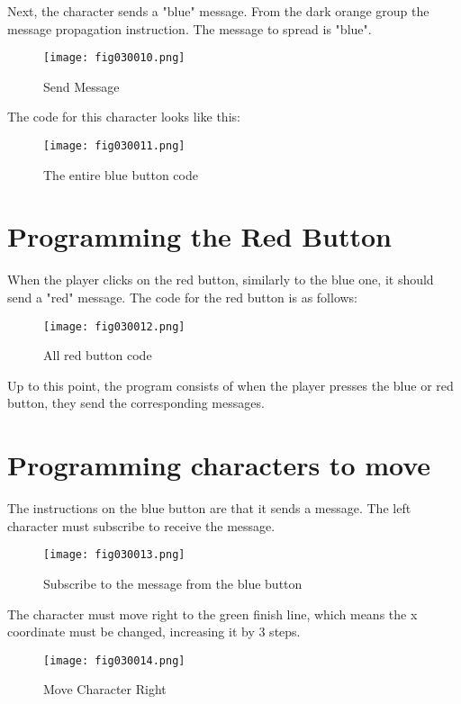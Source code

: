 Next, the character sends a "blue" message. From the dark orange group the message propagation instruction. The message to spread is "blue".

\begin{figure}[H]
   \centering
   \texttt{[image: fig030010.png]}
   \caption{Send Message}
\label{fig030010}
\end{figure}

The code for this character looks like this:

\begin{figure}[H]
   \centering
   \texttt{[image: fig030011.png]}
   \caption{The entire blue button code}
\label{fig030011}
\end{figure}

\section{Programming the Red Button}
When the player clicks on the red button, similarly to the blue one, it should send a "red" message. The code for the red button is as follows:

\begin{figure}[H]
   \centering
   \texttt{[image: fig030012.png]}
   \caption{All red button code}
\label{fig030012}
\end{figure}

Up to this point, the program consists of when the player presses the blue or red button, they send the corresponding messages.

\section{Programming characters to move}
The instructions on the blue button are that it sends a message. The left character must subscribe to receive the message.

\begin{figure}[H]
   \centering
   \texttt{[image: fig030013.png]}
   \caption{Subscribe to the message from the blue button}
\label{fig030013}
\end{figure}

The character must move right to the green finish line, which means the x coordinate must be changed, increasing it by 3 steps.

\begin{figure}[H]
\centering
   \texttt{[image: fig030014.png]}
   \caption{Move Character Right}
\label{fig030014}
\end{figure}

